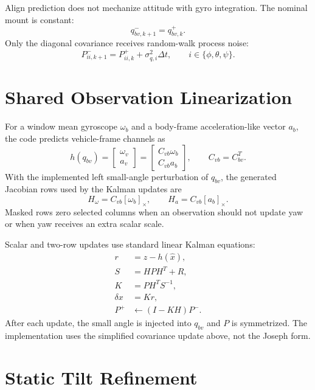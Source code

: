 \documentclass[11pt]{article}
\newcommand{\crossmat}[1]{\left[#1\right]_\times}
\newcommand{\T}{^{T}}
\begin{document}
Align prediction does not mechanize attitude with gyro integration. The nominal
mount is constant:
\begin{equation}
  q_{bv,k+1}^{-}=q_{bv,k}^{+}.
\end{equation}
Only the diagonal covariance receives random-walk process noise:
\begin{equation}
  P_{ii,k+1}^{-}=P_{ii,k}^{+}+\sigma_{q,i}^{2}\Delta t,
  \qquad i\in\{\phi,\theta,\psi\}.
\end{equation}

\section{Shared Observation Linearization}

For a window mean gyroscope \(\omega_b\) and a body-frame acceleration-like
vector \(a_b\), the code predicts vehicle-frame channels as
\begin{equation}
  h(q_{bv}) =
  \begin{bmatrix}
  \omega_v \\ a_v
  \end{bmatrix}
  =
  \begin{bmatrix}
  C_{vb}\omega_b \\ C_{vb}a_b
  \end{bmatrix},
  \qquad C_{vb}=C_{bv}\T .
\end{equation}
With the implemented left small-angle perturbation of \(q_{bv}\), the generated
Jacobian rows used by the Kalman updates are
\begin{equation}
  H_\omega = C_{vb}\crossmat{\omega_b},
  \qquad
  H_a = C_{vb}\crossmat{a_b}.
\end{equation}
Masked rows zero selected columns when an observation should not update yaw or
when yaw receives an extra scalar scale.

Scalar and two-row updates use standard linear Kalman equations:
\begin{align}
  r &= z-h(\hat x),\\
  S &= HPH\T+R,\\
  K &= PH\T S^{-1},\\
  \delta x &= Kr,\\
  P^{+} &\leftarrow (I-KH)P^{-}.
\end{align}
After each update, the small angle is injected into \(q_{bv}\) and \(P\) is
symmetrized. The implementation uses the simplified covariance update above,
not the Joseph form.

\section{Static Tilt Refinement}
\end{document}
